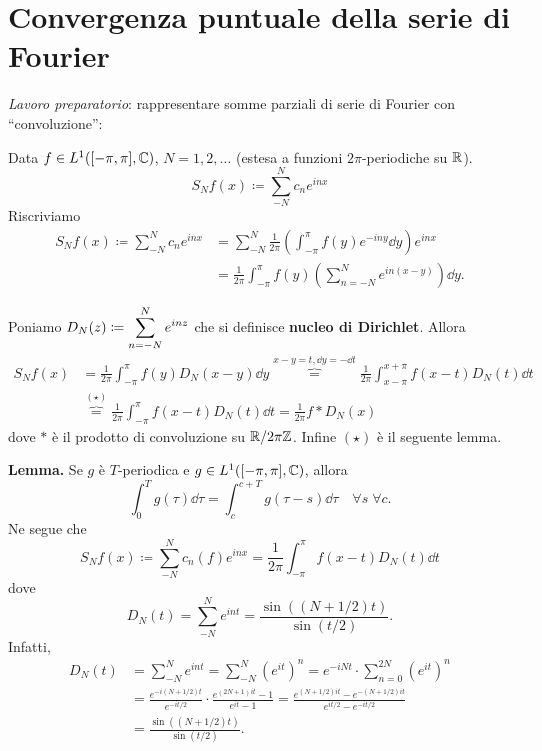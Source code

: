 \section{Convergenza puntuale della serie di Fourier}


\textit{Lavoro preparatorio}: rappresentare somme parziali di serie di Fourier con ``convoluzione'':

Data $f \in L^1([-\pi,\pi], \mathbb C) $, $N = 1,2,\ldots$ (estesa a funzioni $2\pi$-periodiche su $\mathbb R$).
%
$$
S_N f(x) \coloneqq \sum_{-N}^N c_n e^{inx}  
$$
%
Riscriviamo
%
\begin{align*}
	S_N f(x) \coloneqq \sum_{-N}^N c_n e^{inx} 
	& = \sum_{-N}^N \frac{1}{2\pi} \left( \int_{-\pi}^\pi f(y) e^{-iny} \dd y \right) e^{inx} \\
	& = \frac{1}{2\pi} \int_{-\pi}^\pi f(y) \left( \sum_{n=-N}^{N} e^{in(x-y)}  \right) \dd y.
\end{align*}

Poniamo $\displaystyle D_N(z) \coloneqq \sum_{n=-N}^{N} e^{inz} $ che si definisce \textbf{nucleo di Dirichlet}. Allora
%
\begin{align*}
	S_N f(x) & = \frac{1}{2\pi} \int_{-\pi}^\pi f(y) D_N(x-y) \dd y \overbrace{=}^{x-y=t, \dd y = - \dd t} \frac{1}{2\pi} \int_{x-\pi}^{x+\pi} f(x-t) D_N(t) \dd t \\
	& \overbrace{=}^{(\star)} \frac{1}{2\pi} \int_{-\pi}^\pi f(x-t) D_N(t) \dd t 
	= \frac{1}{2\pi} f \ast D_N(x)
\end{align*}
dove $\ast$ è il prodotto di convoluzione su $\mathbb R / 2\pi\mathbb Z$. Infine $(\star)$ è il seguente lemma.

\textbf{Lemma.} Se $g$ è $T$-periodica e $g \in L^1([-\pi,\pi], \mathbb C) $, allora
%
$$
	\int_0^T g(\tau) \dd \tau = \int_c^{c+T} g(\tau-s) \dd \tau \quad \forall s \; \forall c.
$$
%
Ne segue che
%
$$
	S_N f(x) \coloneqq \sum_{-N}^{N} c_n(f) e^{inx} = \frac{1}{2\pi} \int_{-\pi}^\pi f(x-t) D_N(t) \dd t 
$$
%
dove
%
$$
	D_N(t) = \sum_{-N}^{N} e^{int} = \frac{\sin( (N+ 1/2)t)}{\sin(t/2)}.
$$
%
Infatti,
%
\begin{align*}
	D_N(t) & = \sum_{-N}^N e^{int} = \sum_{-N}^N ( e^{it} )^n = e^{-iNt} \cdot \sum_{n=0}^{2N} ( e^{it} )^n \\
	& = \frac{e^{-i(N + 1/2)t}}{e^{-i t/2}} \cdot \frac{e^{(2N+1) it} - 1}{e^{it} - 1} = \frac{e^{(N+1/2)it} - e^{-(N+1/2)it}}{e^{i t/2} - e^{-i t/2}} \\
	& = \frac{\sin ( (N+1/2)t)}{\sin(t/2)}.
\end{align*}

